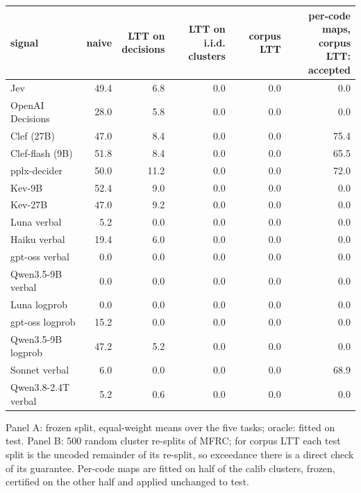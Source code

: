\begin{table}[t]
\begin{adjustbox}{max width=\linewidth}
\begin{tabular}{lrrrrr}
\toprule
signal & naive & \makecell[br]{LTT on \\{} decisions} & \makecell[br]{LTT on i.i.d. \\{} clusters} & corpus LTT & \makecell[br]{per-code maps, \\{} corpus LTT: \\{} accepted} \\
\midrule
Jev & 49.4 & 6.8 & 0.0 & 0.0 & 0.0 \\
OpenAI Decisions & 28.0 & 5.8 & 0.0 & 0.0 & 0.0 \\
Clef (27B) & 47.0 & 8.4 & 0.0 & 0.0 & 75.4 \\
Clef-flash (9B) & 51.8 & 8.4 & 0.0 & 0.0 & 65.5 \\
pplx-decider & 50.0 & 11.2 & 0.0 & 0.0 & 72.0 \\
Kev-9B & 52.4 & 9.0 & 0.0 & 0.0 & 0.0 \\
Kev-27B & 47.0 & 9.2 & 0.0 & 0.0 & 0.0 \\
Luna verbal & 5.2 & 0.0 & 0.0 & 0.0 & 0.0 \\
Haiku verbal & 19.4 & 6.0 & 0.0 & 0.0 & 0.0 \\
gpt-oss verbal & 0.0 & 0.0 & 0.0 & 0.0 & 0.0 \\
Qwen3.5-9B verbal & 0.0 & 0.0 & 0.0 & 0.0 & 0.0 \\
Luna logprob & 0.0 & 0.0 & 0.0 & 0.0 & 0.0 \\
gpt-oss logprob & 15.2 & 0.0 & 0.0 & 0.0 & 0.0 \\
Qwen3.5-9B logprob & 47.2 & 5.2 & 0.0 & 0.0 & 0.0 \\
Sonnet verbal & 6.0 & 0.0 & 0.0 & 0.0 & 68.9 \\
Qwen3.8-2.4T verbal & 5.2 & 0.6 & 0.0 & 0.0 & 0.0 \\
\bottomrule
\end{tabular}
\end{adjustbox}
\par\smallskip\footnotesize\raggedright Panel A: frozen split, equal-weight means over the five tasks; oracle: fitted on test. Panel B: 500 random cluster re-splits of MFRC; for corpus LTT each test split is the uncoded remainder of its re-split, so exceedance there is a direct check of its guarantee. Per-code maps are fitted on half of the calib clusters, frozen, certified on the other half and applied unchanged to test.
\end{table}

